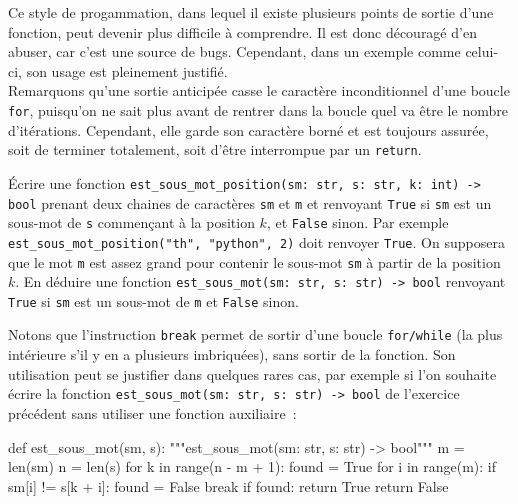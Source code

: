 \documentclass{magnoliaold}
\begin{document}
\noindent
Ce style de progammation, dans lequel il existe plusieurs points de sortie d'une fonction,
peut devenir plus difficile à comprendre. Il est donc découragé d'en abuser,
car c'est une source de bugs. Cependant, dans un exemple comme celui-ci, son usage est pleinement justifié.\\

Remarquons qu'une sortie anticipée casse le caractère inconditionnel d'une boucle \verb!for!, puisqu'on
ne sait plus avant de rentrer dans la boucle quel va être le nombre d'itérations. Cependant, elle
garde son caractère borné et est toujours assurée, soit de terminer totalement, soit
d'être interrompue par un \verb!return!.
\vspace{2ex}
\begin{exoUnique}
\exo
  \begin{questions}
  \question Écrire une fonction \verb!est_sous_mot_position(sm: str, s: str, k: int) -> bool! 
    prenant deux chaines de caractères \verb_sm_ et \verb_m_ et renvoyant \verb!True! si
    \verb!sm! est un sous-mot de \verb!s! commençant à la position $k$, et \verb!False! sinon.
    Par exemple \verb!est_sous_mot_position("th", "python", 2)! doit renvoyer \verb!True!.
    On supposera que le mot \verb!m! est assez grand pour contenir le sous-mot \verb!sm! à
    partir de la position $k$.
  \question En déduire une fonction \verb!est_sous_mot(sm: str, s: str) -> bool! renvoyant
    \verb!True! si \verb!sm! est un sous-mot de \verb!m! et \verb!False! sinon.
  \end{questions}
\end{exoUnique}
\vspace{2ex}
Notons que l'instruction \verb_break_ permet de sortir d'une boucle \verb!for/while!
(la plus intérieure s'il y en a plusieurs imbriquées), sans sortir de la fonction.
Son utilisation peut se justifier dans quelques rares cas,
par exemple si l'on souhaite écrire la fonction \verb!est_sous_mot(sm: str, s: str) -> bool! de
l'exercice précédent sans utiliser une fonction auxiliaire~:

\begin{pythoncodeline}
def est_sous_mot(sm, s):
    """est_sous_mot(sm: str, s: str) -> bool"""
    m = len(sm)
    n = len(s)
    for k in range(n - m + 1):
        found = True
        for i in range(m):
            if sm[i] != s[k + i]:
                found = False
                break
        if found:
            return True
    return False    
\end{pythoncodeline}
\end{document}

